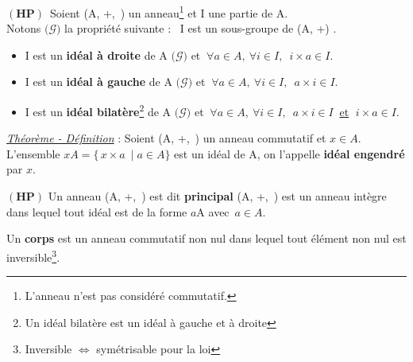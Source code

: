 \(\left(\mathbf{HP}\right)\,\) Soient (A, +,\ \x) un anneau\footnote{L'anneau n'est pas considéré commutatif.} et I une partie de A.\vspace{0.1cm}\\
Notons \(\bigl(\mathscr{G}\bigr)\) la propriété suivante : \guillemetleft\, I est un sous-groupe de (A, +) \guillemetright.\vspace{0.25cm}
\begin{itemize}[leftmargin=0.3cm,label=•]
    \item I est un \textbf{idéal à droite} de A \ssi \(\bigl(\mathscr{G}\bigr)\) et \(\ \forall a\in A,\ \forall i\in I, \ \; i\times a \in I.\)
    
    \item I est un \textbf{idéal à gauche} de A \ssi \(\bigl(\mathscr{G}\bigr)\) et \(\ \forall a\in A,\ \forall i\in I, \ \; a\times i \in I.\)
    
    \item I est un \textbf{idéal bilatère}\footnote{Un idéal bilatère est un idéal à gauche et à droite} de A \ssi \(\bigl(\mathscr{G}\bigr)\) et \(\ \forall a\in A,\ \forall i\in I,\ \; a\times i \in I\ \) \underline{et} \(\; i\times a \in I.\)
\end{itemize}

\vspace{1cm}


\underline{\emph{Théorème - Définition}} : Soient (A, +,\ \x) un anneau commutatif et $x \in A$.\\
L'ensemble \( xA = \{\, x\times a \ \mid a\in A \}\) est un idéal de A, on l'appelle \textbf{idéal engendré} par $x$.

\vspace{1cm}

\(\left(\mathbf{HP}\right)\) Un anneau (A, +,\ \x) est dit \textbf{principal} \ssi (A, +,\ \x) est un anneau intègre dans lequel tout idéal est de la forme $a$A avec $\,a\in \!A$.

\vspace{1.2cm}

\noindent Un \textbf{corps} est un anneau commutatif non nul dans lequel tout élément non nul est inversible\footnote{Inversible $\Leftrightarrow$ symétrisable pour la loi \x}.

\vspace{1cm}

